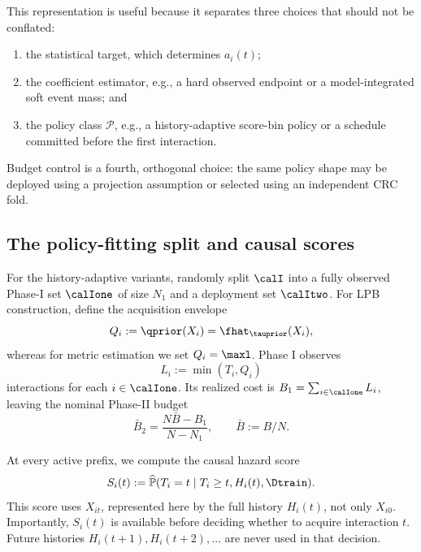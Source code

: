 This representation is useful because it separates three choices that should
not be conflated:
\begin{enumerate}
    \item the statistical target, which determines $a_i(t)$;
    \item the coefficient estimator, e.g., a hard observed endpoint or a
    model-integrated soft event mass; and
    \item the policy class $\mathcal{P}$, e.g., a history-adaptive score-bin
    policy or a schedule committed before the first interaction.
\end{enumerate}
Budget control is a fourth, orthogonal choice: the same policy shape may be
deployed using a projection assumption or selected using an independent CRC
fold.

\subsection{The policy-fitting split and causal scores}

For the history-adaptive variants, randomly split $\calI$ into a fully
observed Phase-I set $\calIone$ of size $N_1$ and a deployment set
$\calItwo$.  For LPB construction, define the acquisition envelope
\begin{equation}
    Q_i:=\qprior(X_i)=\fhat_{\tauprior}(X_i),
\end{equation}
whereas for metric estimation we set $Q_i=\maxl$.  Phase I observes
\begin{equation}
    L_i:=\min(T_i,Q_i)
\end{equation}
interactions for each $i\in\calIone$.  Its realized cost is
$B_1=\sum_{i\in\calIone}L_i$, leaving the nominal Phase-II budget
\begin{equation}
    \bar B_2=\frac{N\bar B-B_1}{N-N_1},
    \qquad \bar B:=B/N.
    \label{eq:generalized_phase2_budget}
\end{equation}

At every active prefix, we compute the causal hazard score
\begin{equation}
    S_i(t)
    :=\widehat{\mathbb P}
    (T_i=t\mid T_i\geq t,H_i(t),\Dtrain).
    \label{eq:causal_hazard_score}
\end{equation}
This score uses $X_{it}$, represented here by the full history $H_i(t)$, not
only $X_{i0}$.  Importantly, $S_i(t)$ is available before deciding whether to
acquire interaction $t$.  Future histories $H_i(t+1),H_i(t+2),\ldots$ are
never used in that decision.

